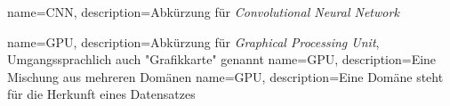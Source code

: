 

{
	name={CNN},
	description={Abkürzung für \emph{Convolutional Neural Network}}
}

{
  name={GPU},
  description={Abkürzung für \emph{Graphical Processing Unit}, Umgangssprachlich auch "Grafikkarte" genannt}
}
{
	name={GPU},
	description={Eine Mischung aus mehreren Domänen}
}
{
	name={GPU},
	description={Eine Domäne steht für die Herkunft eines Datensatzes}
}

